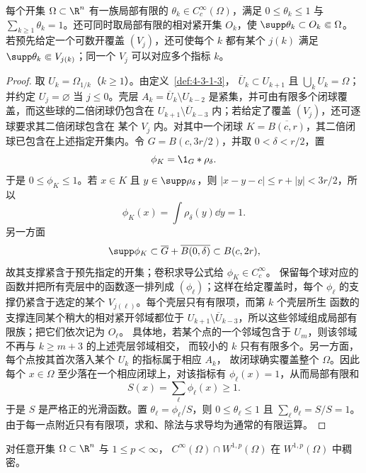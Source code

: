 \begin{lemma}[光滑单位分解的局部构造]\label{lemma:4-3-3-smooth-partition}
每个开集 $\Omega\subset\R^n$ 有一族局部有限的
$\theta_k\in C_c^\infty(\Omega)$，满足 $0\leq\theta_k\leq1$ 与
$\sum_{k\geq1}\theta_k=1$。还可同时取局部有限的相对紧开集 $O_k$，使
$\supp\theta_k\subset O_k\Subset\Omega$。若预先给定一个可数开覆盖 $(V_j)$，还可使每个 $k$ 都有某个
$j(k)$ 满足 $\supp\theta_k\Subset V_{j(k)}$；同一个 $V_j$ 可以对应多个指标 $k$。
\end{lemma}

\begin{proof}
取 $U_k=\Omega_{1/k}$（$k\geq1$）。由定义~\ref{def:4-3-1-3}，
$\overline U_k\subset U_{k+1}$ 且 $\bigcup_kU_k=\Omega$；并约定
$U_j=\varnothing$ 当 $j\leq0$。壳层
$A_k=\overline U_k\setminus U_{k-2}$ 是紧集，并可由有限多个闭球覆盖，而这些球的二倍闭球仍包含在
$U_{k+1}\setminus\overline U_{k-3}$ 内；若给定了覆盖 $(V_j)$，还可逐球要求其二倍闭球包含在
某个 $V_j$ 内。对其中一个闭球 $K=\overline{B(c,r)}$，其二倍闭球已包含在上述指定开集内。令
$G=B(c,3r/2)$，并取 $0<\delta<r/2$，置
\[
 \phi_K=\1_G*\rho_\delta.
\]
于是 $0\leq\phi_K\leq1$。若 $x\in K$ 且 $y\in\supp\rho_\delta$，则
$|x-y-c|\leq r+|y|<3r/2$，所以
\[
 \phi_K(x)=\int\rho_\delta(y)\dd y=1.
\]
另一方面
\[
 \supp\phi_K\subset\overline G+\overline{B(0,\delta)}
 \subset B(c,2r),
\]
故其支撑紧含于预先指定的开集；卷积求导公式给
$\phi_K\in C_c^\infty$。
保留每个球对应的函数并把所有壳层中的函数逐一排列成 $(\phi_\ell)$；这样在给定覆盖时，每个
$\phi_\ell$ 的支撑仍紧含于选定的某个 $V_{j(\ell)}$。每个壳层只有有限项，而第 $k$ 个壳层所生
函数的支撑连同某个稍大的相对紧开邻域都位于
$U_{k+1}\setminus\overline U_{k-3}$，所以这些邻域组成局部有限族；把它们依次记为 $O_\ell$。
具体地，若某个点的一个邻域包含于 $U_m$，则该邻域不再与 $k\geq m+3$ 的上述壳层邻域相交，
而较小的 $k$ 只有有限多个。另一方面，每个点按其首次落入某个 $U_k$ 的指标属于相应 $A_k$，
故闭球确实覆盖整个 $\Omega$。因此每个 $x\in\Omega$ 至少落在一个相应闭球上，对该指标有
$\phi_\ell(x)=1$，从而局部有限和
\[
 S(x)=\sum_\ell\phi_\ell(x)\geq1.
\]
于是 $S$ 是严格正的光滑函数。置 $\theta_\ell=\phi_\ell/S$，则
$0\leq\theta_\ell\leq1$ 且
$\sum_\ell\theta_\ell=S/S=1$。由于每一点附近只有有限项，求和、除法与求导均为通常的有限运算。
\end{proof}

\begin{proposition}\label{proposition:4-3-3-1}
对任意开集 $\Omega\subset\R^n$ 与 $1\leq p<\infty$，
$C^\infty(\Omega)\cap W^{1,p}(\Omega)$ 在 $W^{1,p}(\Omega)$ 中稠密。
\end{proposition}

